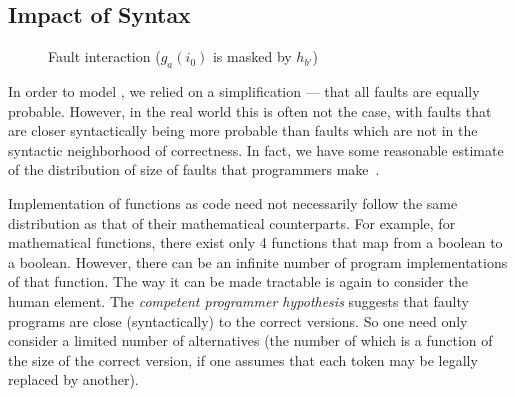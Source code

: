 \documentclass[preprint,nonatbib]{sigplanconf}\usepackage[]{graphicx}\usepackage[]{color}
\begin{document}
\subsection{Impact of Syntax}

\begin{figure}
\centering
{}
\caption{Fault interaction ($g_a(i_0)$ is masked by $h_{b'}$)}
\label{fig:lines}
\end{figure}

In order to model \couplingC, we relied on a simplification ---
that all faults are equally probable. However, in the real world this is often not
the case, with faults that are closer syntactically being more probable than
faults which are not in the syntactic neighborhood of correctness.
In fact, we have some
reasonable estimate of the distribution of size of faults that programmers
make~\cite{gopinath2014mutations}.

Implementation of functions as code
need not necessarily follow the same distribution as that of their mathematical
counterparts. For example, for mathematical functions, there exist only 4
functions that map from a boolean to a boolean. However, there can be an
infinite number of program implementations of that function.
The way it can be made tractable is again to consider the human element.
The \emph{competent programmer hypothesis} suggests that faulty programs are
close (syntactically) to the correct versions. So one need only consider a
limited number of alternatives (the number of which is a function of the size
of the correct version, if one assumes that each token may be legally replaced
by another).
\end{document}
